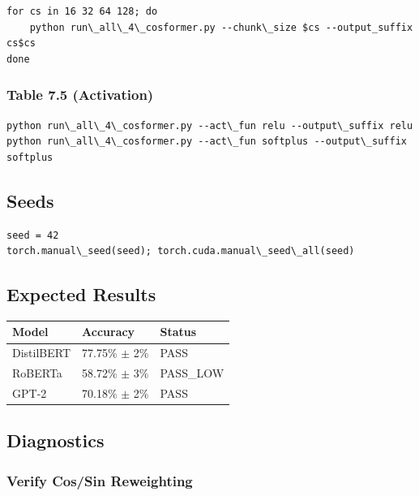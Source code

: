 \begin{lstlisting}
for cs in 16 32 64 128; do
    python run\_all\_4\_cosformer.py --chunk\_size $cs --output_suffix cs$cs
done
\end{lstlisting}

\subsubsection{Table 7.5 (Activation)}

\begin{lstlisting}
python run\_all\_4\_cosformer.py --act\_fun relu --output\_suffix relu
python run\_all\_4\_cosformer.py --act\_fun softplus --output\_suffix softplus
\end{lstlisting}

\subsection{Seeds}

\begin{lstlisting}
seed = 42
torch.manual\_seed(seed); torch.cuda.manual\_seed\_all(seed)
\end{lstlisting}

\subsection{Expected Results}

\begin{table}[H]
\centering
\small
\begin{tabular}{lll}
\toprule
\textbf{Model} & \textbf{Accuracy} & \textbf{Status} \\
\midrule
DistilBERT & 77.75\% $\pm$ 2\% & PASS \\
RoBERTa & 58.72\% $\pm$ 3\% & PASS\_LOW \\
GPT-2 & 70.18\% $\pm$ 2\% & PASS \\
\bottomrule
\end{tabular}
\end{table}

\subsection{Diagnostics}

\subsubsection{Verify Cos/Sin Reweighting}

